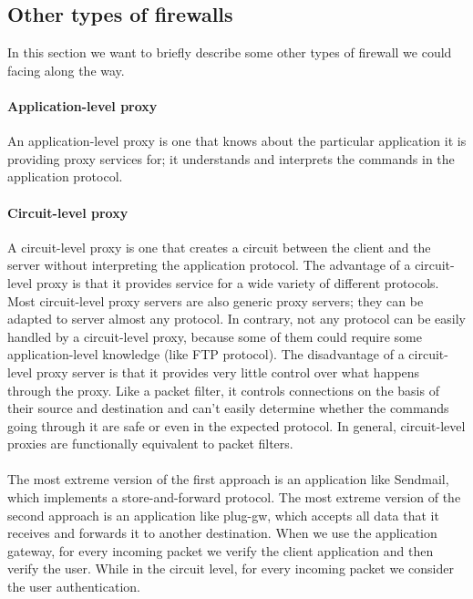 \documentclass[11pt]{article}
\begin{document}
\subsection{Other types of firewalls}
In this section we want to briefly describe some other types of firewall we could facing along the way.
\paragraph{Application-level proxy} An application-level proxy is one that knows about the particular application it is providing proxy services for; it understands and interprets the commands in the application protocol. 
\paragraph{Circuit-level proxy} A circuit-level proxy is one that creates a circuit between the client and the server without interpreting the application protocol. The advantage of a circuit-level proxy is that it provides service for a wide variety of different protocols. Most circuit-level proxy servers are also generic proxy servers; they can be adapted to server almost any protocol. In contrary, not any protocol can be easily handled by a circuit-level proxy, because some of them could require some application-level knowledge (like FTP protocol). The disadvantage of a circuit-level proxy server is that it provides very little control over what happens through the proxy. Like a packet filter, it controls connections on the basis of their source and destination and can't easily determine whether the commands going through it are safe or even in the expected protocol. In general, circuit-level proxies are functionally equivalent to packet filters.\\\\The most extreme version of the first approach is an application like Sendmail, which implements a store-and-forward protocol. The most extreme version of the second approach is an application like plug-gw, which accepts all data that it receives and forwards it to another destination. When we use the application gateway, for every incoming packet we verify the client application and then verify the user. While in the circuit level, for every incoming packet we consider the user authentication.
\end{document}
